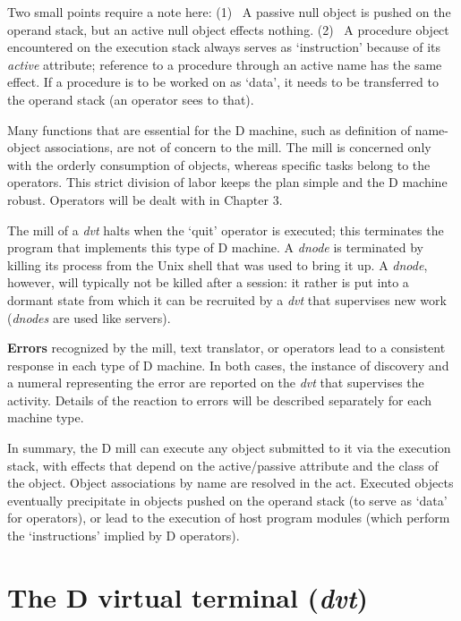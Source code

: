 Two small points require a note here:  (1)~ A passive null object is pushed  on the  operand  stack,  but  an active null  object  effects  nothing.  (2)~ A procedure object  encountered on the execution stack always  serves  as `instruction' because of its \emph{active} attribute;  reference to a  procedure through  an  active name has the same effect.  If a procedure  is  to  be worked  on  as `data',  it needs to be transferred to the  operand  stack (an operator sees to that).

Many functions that are essential for the D machine,  such as definition of name-object associations,  are not of concern to the mill. The mill is concerned only with the orderly consumption of objects,  whereas specific tasks   belong  to  the  operators.   This  strict  division   of   labor keeps  the plan simple and the D machine robust.  Operators will  be  dealt with in Chapter 3.

The  mill  of a \emph{dvt} halts when  the `quit' operator is executed; this terminates the program that implements this type of D machine. A \emph{dnode} is terminated by killing its process from the Unix shell that was used to bring it up. A \emph{dnode}, however, will typically not be killed after a session: it rather is put into a dormant state from which it can be recruited by a \emph{dvt} that supervises new work (\emph{dnodes} are used like servers).

\textbf{Errors} recognized by the  mill,  text  translator,  or operators  lead  to a consistent response in each type of D machine. In both cases, the instance  of  discovery and a numeral representing the  error are reported on the \emph{dvt} that supervises the activity. Details of the reaction to errors will be described separately for each machine type.

In  summary,  the D mill can execute any object submitted to it via  the execution stack, with effects that depend on the active/passive attribute and the class of the object.  Object associations by name are resolved in the act. Executed objects eventually precipitate in objects pushed on the operand  stack  (to  serve  as `data' for  operators),  or  lead  to  the execution  of  host  program modules (which  perform  the  `instructions' implied by D operators).

\section{The D virtual terminal (\emph{dvt})}

